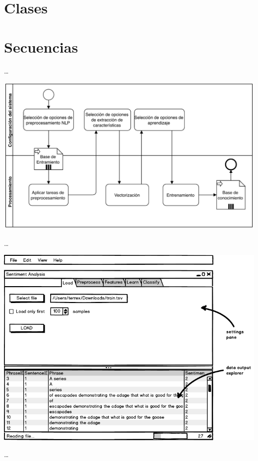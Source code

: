 \section{Clases}

\section{Secuencias}




\resizebox{0.5\textwidth}{!}{}

\ldots

\includegraphics[width=\textwidth]{bpmn-entrenamiento}

\ldots

\includegraphics[width=14cm]{gui-1-load}

\ldots

